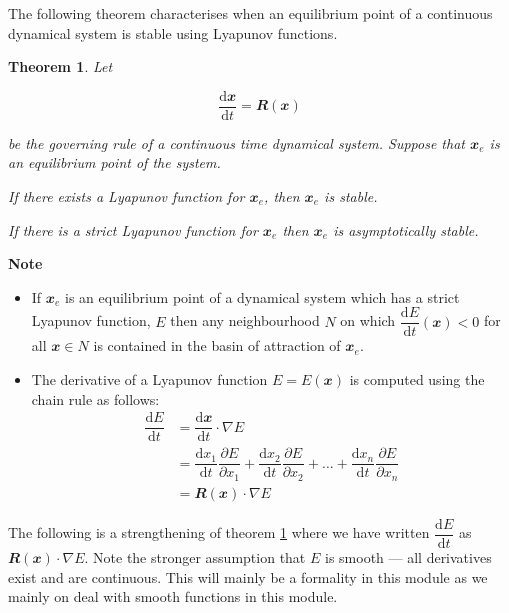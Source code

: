\documentclass[
  a4paper,
  oneside,
  final]{krantz}
\providecommand{\tightlist}{%
  \setlength{\itemsep}{0pt}\setlength{\parskip}{0pt}}
\renewcommand{\d}{\mathrm{d}}
\renewcommand{\v}[1]{{\mathbfit{#1}}}
\newcommand{\pder}[2]{\dfrac{\partial #1}{\partial#2}}
\newcommand{\der}[2]{\dfrac{\d #1}{\d #2}}
\newtheorem{theorem}{Theorem}[chapter]
\theoremstyle{definition}
\theoremstyle{definition}
\theoremstyle{definition}
\theoremstyle{definition}
\theoremstyle{remark}
\begin{document}
The following theorem characterises when an equilibrium point of a continuous dynamical system is stable using Lyapunov functions.

\begin{theorem}
\protect\hypertarget{thm:Lyapunov-stability-cont}{}\label{thm:Lyapunov-stability-cont}Let

\[ \der{\v{x}}{t} = \v{R}(\v{x})\]

be the governing rule of a continuous time dynamical system. Suppose that \(\v{x}_{e}\) is an equilibrium point of the system.

If there exists a Lyapunov function for \(\v{x}_{e}\), then \(\v{x}_{e}\) is stable.

If there is a strict Lyapunov function for \(\v{x}_{e}\) then \(\v{x}_{e}\) is asymptotically stable.
\end{theorem}

\begin{palegreenbox}

\begin{center}
\textbf{Note}

\end{center}

\begin{itemize}
\tightlist
\item
  If \(\v{x}_{e}\) is an equilibrium point of a dynamical system which has a strict Lyapunov function, \(E\) then any neighbourhood \(N\) on which \(\der{E}{t} (\v{x}) < 0\) for all \(\v{x} \in N\) is contained in the basin of attraction of \(\v{x}_{e}\).
\item
  The derivative of a Lyapunov function \(E = E(\v{x})\) is computed using the chain rule as follows:
  \begin{align*}
    \der{E}{t} &= \der{\v{x}}{t}\cdot \nabla E \\
               &= \der{x_1}{t} \pder{E}{x_1} + \der{x_2}{t} \pder{E}{x_2} + \ldots + \der{x_n}{t} \pder{E}{x_n}\\
               & = \v{R}(\v{x}) \cdot \nabla E
  \end{align*}
\end{itemize}

\end{palegreenbox}

The following is a strengthening of theorem \ref{thm:Lyapunov-stability-cont} where we have written \(\der{E}{t}\) as \(\v{R}(\v{x}) \cdot \nabla E\). Note the stronger assumption that \(E\) is smooth --- all derivatives exist and are continuous. This will mainly be a formality in this module as we mainly on deal with smooth functions in this module.
\end{document}
